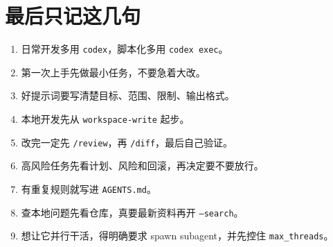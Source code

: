 \documentclass[UTF8,a4paper,11pt]{ctexart}
\begin{document}
\section{最后只记这几句}

\begin{tcolorbox}[colback=SummaryLight,colframe=Summary,title=3 分钟背完,fonttitle=\bfseries]
\begin{enumerate}
  \item 日常开发多用 \texttt{codex}，脚本化多用 \texttt{codex exec}。
  \item 第一次上手先做最小任务，不要急着大改。
  \item 好提示词要写清楚目标、范围、限制、输出格式。
  \item 本地开发先从 \texttt{workspace-write} 起步。
  \item 改完一定先 \texttt{/review}，再 \texttt{/diff}，最后自己验证。
  \item 高风险任务先看计划、风险和回滚，再决定要不要放行。
  \item 有重复规则就写进 \texttt{AGENTS.md}。
  \item 查本地问题先看仓库，真要最新资料再开 \texttt{--search}。
  \item 想让它并行干活，得明确要求 spawn subagent，并先控住 \texttt{max\_threads}。
\end{enumerate}
\end{tcolorbox}
\end{document}
